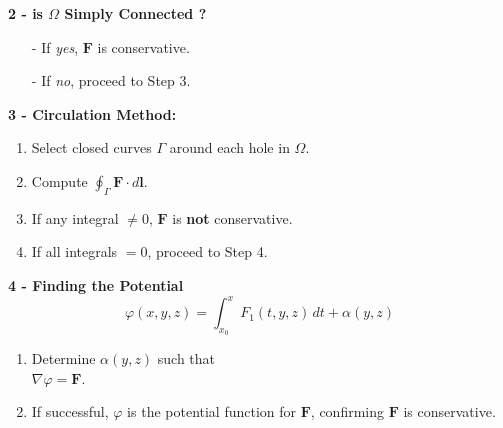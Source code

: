 \documentclass[8pt]{article}
\begin{document}
\hfill
\begin{minipage}[t]{0.25\textwidth}
    \noindent\textbf{2 - is $\Omega$ Simply Connected ?} \vspace{-8px}
    \begin{itemize}[leftmargin=*]
        \setlength\itemsep{-4px}
        \item[-] If \textit{yes}, $\mathbf{F}$ is conservative.
        \item[-] If \textit{no}, proceed to Step 3.
    \end{itemize}
\end{minipage}
\hfill
\begin{minipage}[t]{0.23\textwidth}
    \noindent\textbf{3 - Circulation Method:} \vspace{-8px}

    \begin{enumerate}[leftmargin=*]
        \setlength\itemsep{-4px}
        \item Select closed curves $\Gamma$ around each hole in $\Omega$.
        \item Compute $\oint_{\Gamma} \mathbf{F} \cdot d\mathbf{l}$.
        \item If any integral $\neq 0$, $\mathbf{F}$ is \textbf{not} conservative.
        \item If all integrals $=0$, proceed to Step 4.
    \end{enumerate}
\end{minipage}
\hfill
\begin{minipage}[t]{0.29\textwidth}
    \noindent\textbf{4 - Finding the Potential} \vspace{-8px}
    \[
        \varphi(x,y,z) = \int_{x_0}^x F_1(t,y,z) \, dt + \alpha(y,z)
    \] \vspace{-25px}

    \begin{enumerate}[leftmargin=*]
        \setlength\itemsep{-4px} %
        \item Determine $\alpha(y,z)$ such that \\ $\nabla \varphi = \mathbf{F}$.
        \item If successful, $\varphi$ is the potential function for $\mathbf{F}$, confirming $\mathbf{F}$ is conservative.
    \end{enumerate}

\end{minipage}
\vspace*{-30px}
\end{document}
